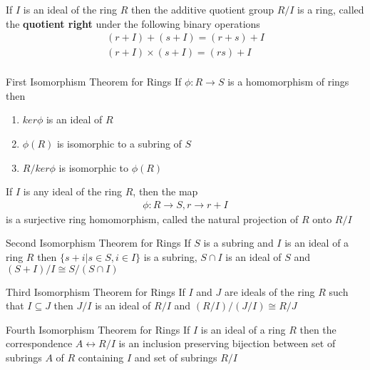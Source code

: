 \documentclass[titlepage, 12pt]{article}
\begin{document}
\begin{proposition}{}{}
    If $I$ is an ideal of the ring $R$ then the additive quotient group $R/I$ is
    a ring, called the \textbf{quotient right} under the following binary
    operations
    \begin{gather*}
        (r + I) + (s + I) = (r + s) + I\\
        (r + I) \times (s + I) = (rs) + I\\
    \end{gather*}
\end{proposition}

\begin{theorem}{First Isomorphism Theorem for Rings}{}
    If $\phi:R\rightarrow S$ is a homomorphism of rings then
    \begin{enumerate}
        \item $ker\phi$ is an ideal of $R$
        \item $\phi(R)$ is isomorphic to a subring of $S$
        \item $R/ker\phi$ is isomorphic to $\phi(R)$
    \end{enumerate}
\end{theorem}

\begin{definition}{}{}
    If $I$ is any ideal of the ring $R$, then the map
    \begin{gather*}
        \phi:R\rightarrow S, r\rightarrow r+I
    \end{gather*}
    is a surjective ring homomorphism, called the natural projection of $R$ onto
    $R/I$
\end{definition}

\begin{theorem}{Second Isomorphism Theorem for Rings}{}
    If $S$ is a subring and $I$ is an ideal of a ring $R$ then $\{s + i|s\in S,
    i\in I\}$ is a subring, $S\cap I$ is an ideal of $S$ and $(S+I)/I\cong
    S/(S\cap I)$
\end{theorem}

\begin{theorem}{Third Isomorphism Theorem for Rings}{}
    If $I$ and $J$ are ideals of the ring $R$ such that $I\subseteq J$ then
    $J/I$ is an ideal of $R/I$ and $(R/I)/(J/I)\cong R/J$
\end{theorem}

\begin{theorem}{Fourth Isomorphism Theorem for Rings}{}
    If $I$ is an ideal of a ring $R$ then the correspondence $A\leftrightarrow
    R/I$ is an inclusion preserving bijection between set of subrings $A$ of $R$
    containing $I$ and set of subrings $R/I$
\end{theorem}
\end{document}
